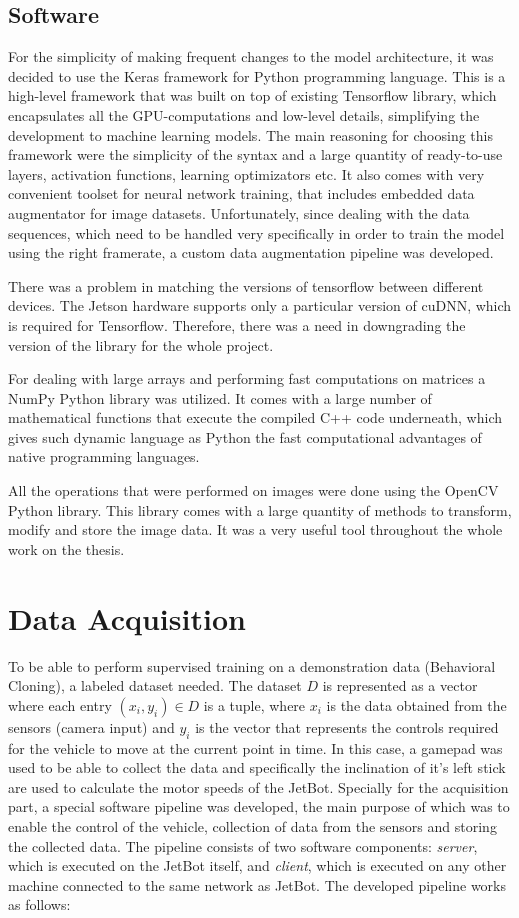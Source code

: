 \subsection{Software}
For the simplicity of making frequent changes to the model architecture, it was decided to use the Keras framework for Python programming language. This is a high-level framework that was built on top of existing Tensorflow library, which encapsulates all the GPU-computations and low-level details, simplifying the development to machine learning models. The main reasoning for choosing this framework were the simplicity of the syntax and a large quantity of ready-to-use layers, activation functions, learning optimizators etc. It also comes with very convenient toolset for neural network training, that includes embedded data augmentator for image datasets. Unfortunately, since dealing with the data sequences, which need to be handled very specifically in order to train the model using the right framerate, a custom data augmentation pipeline was developed.

There was a problem in matching the versions of tensorflow between different devices. The Jetson hardware supports only a particular version of cuDNN, which is required for Tensorflow. Therefore, there was a need in downgrading the version of the library for the whole project.

For dealing with large arrays and performing fast computations on matrices a NumPy Python library was utilized. It comes with a large number of mathematical functions that execute the compiled C++ code underneath, which gives such dynamic language as Python the fast computational advantages of native programming languages.

All the operations that were performed on images were done using the OpenCV Python library. This library comes with a large quantity of methods to transform, modify and store the image data. It was a very useful tool throughout the whole work on the thesis.

\section{Data Acquisition}

To be able to perform supervised training on a demonstration data (Behavioral Cloning), a labeled dataset needed. The dataset $D$ is represented as a vector where each entry $(x_i, y_i) \in D$ is a tuple, where $x_i$ is the data obtained from the sensors (camera input) and $y_i$ is the vector that represents the controls required for the vehicle to move at the current point in time. In this case, a gamepad was used to be able to collect the data and specifically the inclination of it's left stick are used to calculate the motor speeds of the JetBot. Specially for the acquisition part, a special software pipeline was developed, the main purpose of which was to enable the control of the vehicle, collection of data from the sensors and storing the collected data. The pipeline consists of two software components: \textit{server}, which is executed on the JetBot itself, and \textit{client}, which is executed on any other machine connected to the same network as JetBot. The developed pipeline works as follows:

